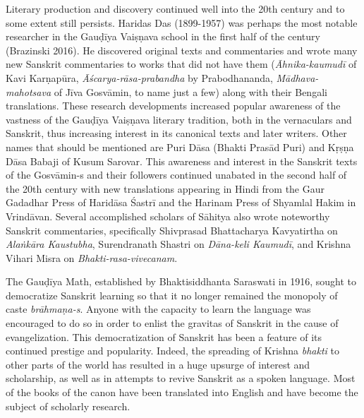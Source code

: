 Literary production and discovery continued well into the 20th century and to some extent still persists. Haridas Das (1899-1957) was perhaps the most notable researcher in the Gauḍīya Vaiṣṇava school in the first half of the century (Brazinski 2016). He discovered original texts and commentaries and wrote many new Sanskrit commentaries to works that did not have them ({\sl Āhnika-kaumudī} of Kavi Karṇapūra, {\sl Āścarya-rāsa-prabandha} by Prabodhananda, {\sl Mādhava-mahotsava} of Jīva Gosvāmin, to name just a few) along with their Bengali translations. These research developments increased popular awareness of the vastness of the Gauḍīya Vaiṣṇava literary tradition, both in the vernaculars and Sanskrit, thus increasing interest in its canonical texts and later writers. Other names that should be mentioned are Puri Dāsa (Bhakti Prasād Puri) and Kṛṣṇa Dāsa Babaji of Kusum Sarovar. This awareness and interest in the Sanskrit texts of the Gosvāmin-s and their followers continued unabated in the second half of the 20th century with new translations appearing in Hindi from the Gaur Gadadhar Press of Haridāsa Śastrī and the Harinam Press of Shyamlal Hakim in Vrindāvan. Several accomplished scholars of Sāhitya also wrote noteworthy Sanskrit commentaries, specifically Shivprasad Bhattacharya Kavyatirtha on {\sl Alaṅkāra Kaustubha}, Surendranath Shastri on {\sl Dāna-keli Kaumudī}, and Krishna Vihari Misra on {\sl Bhakti-rasa-vivecanam}. 

The Gauḍīya Math, established by Bhaktisiddhanta Saraswati in 1916, sought to democratize Sanskrit learning so that it no longer remained the monopoly of caste {\sl brāhmaṇa-s}. Anyone with the capacity to learn the language was encouraged to do so in order to enlist the gravitas of Sanskrit in the cause of evangelization. This democratization of Sanskrit has been a feature of its continued prestige and popularity. Indeed, the spreading of Krishna {\sl bhakti} to other parts of the world has resulted in a huge upsurge of interest and scholarship, as well as in attempts to revive Sanskrit as a spoken language. Most of the books of the canon have been translated into English and have become the subject of scholarly research. 

